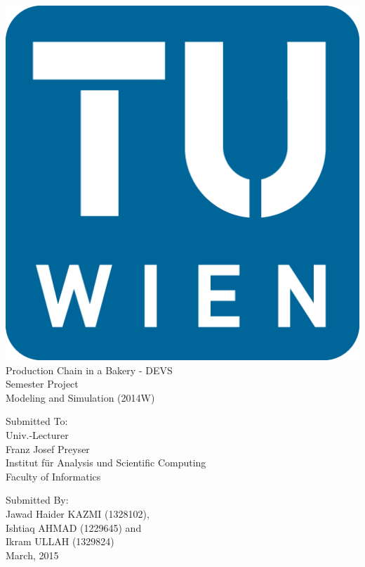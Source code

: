 \documentclass[titlepage]{article}%
\begin{document}
\pagestyle{empty}
\begin{center}
\includegraphics[scale=0.3]{TU-Signet.png}
\vspace{2cm}
{\huge \\Production Chain in a Bakery - DEVS\\}
\vspace{1cm}
{\Large Semester Project\\Modeling and Simulation (2014W)\\}

\vspace{3cm}
{Submitted To:\\}
\vspace{0.3cm}
{Univ.-Lecturer\\}
{Franz Josef Preyser\\}
{Institut für Analysis und Scientific Computing\\}
{Faculty of Informatics\\}

\vspace{2cm}
{Submitted By:\\}
\vspace{0.3cm}
{Jawad Haider KAZMI (1328102), \\ Ishtiaq AHMAD (1229645) and \\ Ikram ULLAH (1329824) \\}						%
\vspace{2cm}
March, 2015
\end{center}
\end{document}
